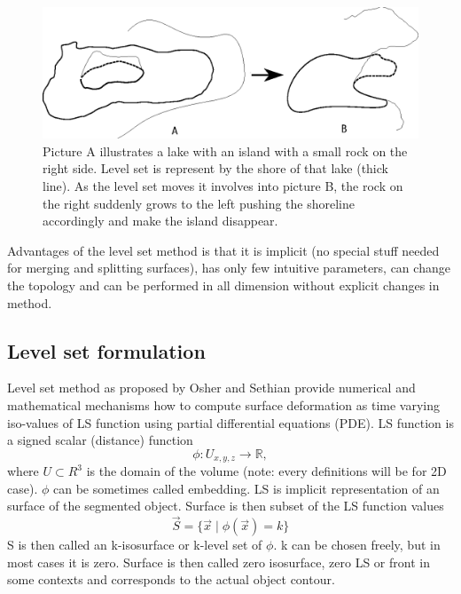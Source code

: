 \begin{enumerate}
\begin{figure}
    \centering
    \includegraphics[width=15cm]{data/shore}
    \caption[Shore illustration of moving level set]{Picture A illustrates a lake with an island with a small rock on the right side. Level set is represent by the shore of that lake (thick line). As the level set moves it involves into picture B, the rock on the right suddenly grows to the left pushing the shoreline accordingly and make the island disappear.}
    \label{fg:shore}
\end{figure}

Advantages of the level set method is that it is implicit (no special stuff needed for merging and splitting surfaces), has only few intuitive parameters, can change the topology and can be performed in all dimension without explicit changes in method.

\end{enumerate}

\subsection{Level set formulation}

Level set method as proposed by Osher and Sethian \cite{sethianLS} provide numerical and mathematical mechanisms how to compute surface deformation as time varying iso-values of LS function using partial differential equations (PDE).
LS function is a signed scalar (distance) function
\begin{equation}
\phi : U_{x,y,z} \rightarrow \mathbb R,
\end{equation}
where $U \subset R^3$ is the domain of the volume (note: every definitions will be for 2D case).
$\phi$ can be sometimes called embedding. LS is implicit representation of an surface of the segmented object.
Surface is then subset of the LS function values
\begin{equation}
\vec{S} = \{\vec{x}\mid \phi(\vec{x}) = k\}
\end{equation}
S is then called an k-isosurface or k-level set of $\phi$. k can be chosen freely, but in most cases it is zero.
Surface is then called zero isosurface, zero LS or front in some contexts and corresponds to the actual object contour.

